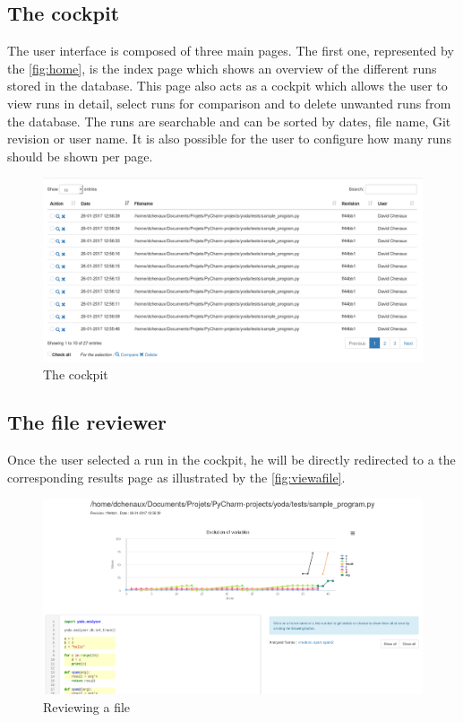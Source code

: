 \subsection{The cockpit}
The user interface is composed of three main pages. The first one, represented by the \autoref{fig:home}, is the index page which shows an overview of the different runs stored in the database. This page also acts as a cockpit which allows the user to view runs in detail, select runs for comparison and to delete unwanted runs from the database. The runs are searchable and can be sorted by dates, file name, Git revision or user name. It is also possible for the user to configure how many runs should be shown per page.
\begin{figure}[h!]
  \centering
    \includegraphics[width=\textwidth]{figures/yoda-home.png}
    \caption{The cockpit}
    \label{fig:home}
\end{figure}

\subsection{The file reviewer}
Once the user selected a run in the cockpit, he will be directly redirected to a the corresponding results page as illustrated by the \autoref{fig:viewafile}. 
\begin{figure}[h!]
  \centering
    \includegraphics[width=\textwidth]{figures/yoda-file.png}
    \caption{Reviewing a file}
    \label{fig:viewafile}
\end{figure}

